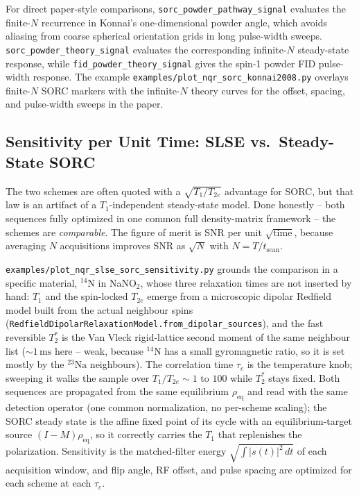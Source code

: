 \documentclass[11pt,oneside]{report}
\newcommand{\code}[1]{\texttt{#1}}
\begin{document}
For direct paper-style comparisons,
\code{sorc\_powder\_pathway\_signal} evaluates the finite-\(N\) recurrence in
Konnai's one-dimensional powder angle, which avoids aliasing from coarse
spherical orientation grids in long pulse-width sweeps.
\code{sorc\_powder\_theory\_signal} evaluates the corresponding infinite-\(N\)
steady-state response, while \code{fid\_powder\_theory\_signal} gives the
spin-1 powder FID pulse-width response. The example
\code{examples/plot\_nqr\_sorc\_konnai2008.py} overlays finite-\(N\) SORC
markers with the infinite-\(N\) theory curves for the offset, spacing, and
pulse-width sweeps in the paper.

\subsection{Sensitivity per Unit Time: SLSE vs.\ Steady-State SORC}
\label{subsec:slse-sorc}

The two schemes are often quoted with a \(\sqrt{T_1/T_{2e}}\) advantage for SORC,
but that law is an artifact of a \(T_1\)-independent steady-state model. Done
honestly -- both sequences fully optimized in one common full density-matrix
framework -- the schemes are \emph{comparable}. The figure of merit is SNR per
unit \(\sqrt{\text{time}}\), because averaging \(N\) acquisitions improves SNR as
\(\sqrt{N}\) with \(N = T/t_{\text{scan}}\).

\code{examples/plot\_nqr\_slse\_sorc\_sensitivity.py} grounds the comparison in a
specific material, \({}^{14}\mathrm{N}\) in NaNO\(_2\), whose three relaxation
times are not inserted by hand: \(T_1\) and the spin-locked \(T_{2e}\) emerge from
a microscopic dipolar Redfield model built from the actual neighbour spins
(\code{RedfieldDipolarRelaxationModel.from\_dipolar\_sources}), and the fast
reversible \(T_2^\ast\) is the Van Vleck rigid-lattice second moment of the same
neighbour list (\(\sim 1\,\mathrm{ms}\) here -- weak, because \({}^{14}\mathrm{N}\)
has a small gyromagnetic ratio, so it is set mostly by the \({}^{23}\mathrm{Na}\)
neighbours). The correlation time \(\tau_c\) is the temperature knob; sweeping it
walks the sample over \(T_1/T_{2e}\sim 1\) to \(100\) while \(T_2^\ast\) stays
fixed. Both sequences are propagated from the same equilibrium \(\rho_{\mathrm{eq}}\)
and read with the same detection operator (one common normalization, no
per-scheme scaling); the SORC steady state is the affine fixed point of its cycle
with an equilibrium-target source \((I-M)\rho_{\mathrm{eq}}\), so it correctly
carries the \(T_1\) that replenishes the polarization. Sensitivity is the
matched-filter energy \(\sqrt{\int|s(t)|^2\,dt}\) of each acquisition window, and
flip angle, RF offset, and pulse spacing are optimized for each scheme at each
\(\tau_c\).
\end{document}
